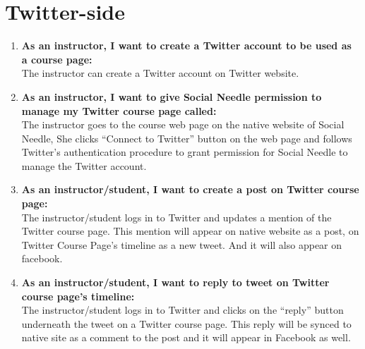 \section{Twitter-side}


\begin{enumerate}

  \item \textbf{As an instructor, I want to create a Twitter account to be used as a course page:} \\
    The instructor can create a Twitter account on Twitter website.

  \item \textbf{As an instructor, I want to give Social Needle
    permission to manage my Twitter course page called:} \\ The
    instructor goes to the course web page on the native website of
    Social Needle, She clicks ``Connect to Twitter'' button on the web
    page and follows Twitter's authentication procedure to grant
    permission for Social Needle to manage the Twitter account.

    \item \textbf{As an instructor/student, I want to create a post on Twitter
      course page:} \\The instructor/student logs in to Twitter and updates a
      mention of the Twitter course page. This mention will appear on
      native website as a post, on Twitter Course Page's timeline as a
      new tweet. And it will also appear on facebook.

      \item \textbf {As an instructor/student, I want to reply to
        tweet on Twitter course page's timeline:} \\The
        instructor/student logs in to Twitter and clicks on the
        ``reply'' button underneath the tweet on a Twitter course
        page. This reply will be synced to native site as a comment to
        the post and it will appear in Facebook as well.

\end{enumerate}

